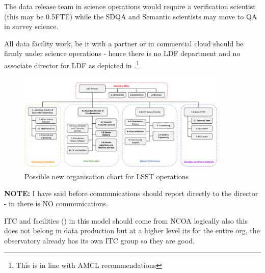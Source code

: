 The data release team in science operations would require a verification scientist (this may be 0.5FTE) while the \gls{SDQA} and Semantic scientists may move to QA in survey science.

All data facility work, be it with a partner or in commercial \gls{cloud} should be firmly under science operations - hence there is no LDF department and no associate director for LDF as depicted in .\footnote{This is  in line with AMCL recommendations}


\begin{figure}
\includegraphics[width=0.9\textwidth]{figures/OpsOrg}
\caption{Possible new organisation chart for \gls{LSST}  operations \label{fig:opsorg}}
\end{figure}

\textbf{NOTE:} I have said before communications should report directly to the director - in  there is NO communications.

ITC and facilities () in this model should come from NCOA  logically also this does not belong in data production but at a higher level its for the entire org, the observatory already has its own ITC group so they are good.

